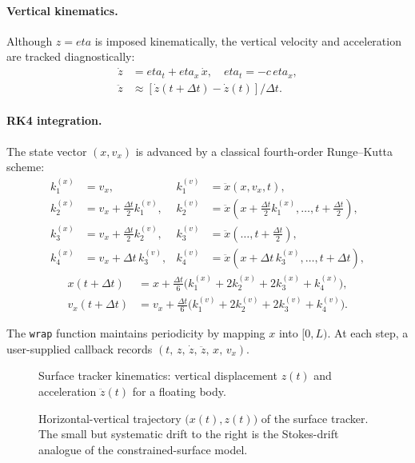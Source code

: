 \documentclass[journal,10pt,twocolumn]{IEEEtran}
\def\eta{eta}%
\begin{document}
\paragraph{Vertical kinematics.}
Although $z = \eta$ is imposed kinematically, the vertical velocity
and acceleration are tracked diagnostically:
\begin{align}
    \dot z  &= \eta_t + \eta_x\,\dot x,
    \quad\eta_t = -c\,\eta_x,\\
    \ddot z &\approx [\dot z(t+\Delta t)-\dot z(t)]/\Delta t.
\end{align}

\paragraph{RK4 integration.}
The state vector $(x,v_x)$ is advanced by a classical
fourth-order Runge--Kutta scheme:
\begin{align*}
    k_1^{(x)} &= v_x,
    &k_1^{(v)} &= \ddot x(x,v_x,t),\\
    k_2^{(x)} &= v_x+\tfrac{\Delta t}{2}k_1^{(v)},
    &k_2^{(v)} &= \ddot x(x+\tfrac{\Delta t}{2}k_1^{(x)},\dots,t+\tfrac{\Delta t}{2}),\\
    k_3^{(x)} &= v_x+\tfrac{\Delta t}{2}k_2^{(v)},
    &k_3^{(v)} &= \ddot x(\dots,t+\tfrac{\Delta t}{2}),\\
    k_4^{(x)} &= v_x+\Delta t\,k_3^{(v)},
    &k_4^{(v)} &= \ddot x(x+\Delta t\,k_3^{(x)},\dots,t+\Delta t),
\end{align*}
\begin{align}
    x(t+\Delta t)   &= x + \tfrac{\Delta t}{6}
    \bigl(k_1^{(x)}+2k_2^{(x)}+2k_3^{(x)}+k_4^{(x)}\bigr),\\
    v_x(t+\Delta t) &= v_x + \tfrac{\Delta t}{6}
    \bigl(k_1^{(v)}+2k_2^{(v)}+2k_3^{(v)}+k_4^{(v)}\bigr).
\end{align}

The \texttt{wrap} function maintains periodicity by mapping $x$ into
$[0,L)$.
At each step, a user-supplied callback records
$(t,\,z,\,\dot z,\,\ddot z,\,x,\,v_x)$.

\begin{figure}[!t]
    \centering
    \resizebox{\linewidth}{!}{}
    \caption{Surface tracker kinematics: vertical displacement
             $z(t)$ and acceleration $\ddot z(t)$ for a floating body.}
    \label{fig:waveKinematics}
\end{figure}

\begin{figure}[!t]
    \centering
    \resizebox{\linewidth}{!}{}
    \caption{Horizontal-vertical trajectory $\bigl(x(t),z(t)\bigr)$
             of the surface tracker.
             The small but systematic drift to the right is the
             Stokes-drift analogue of the constrained-surface model.}
    \label{fig:waveParticlePath}
\end{figure}
\end{document}
